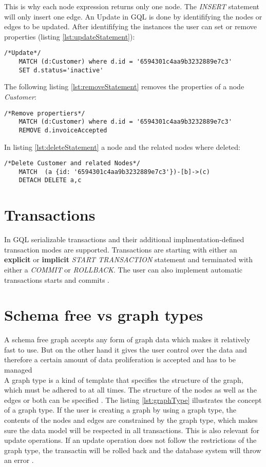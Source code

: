 This is why each node expression returns only one node. The \textit{INSERT} statement will only insert one edge.\newline
An Update in GQL is done by identififying the nodes or edges to be updated.
After identififying the instances the user can set or remove properties (listing \ref{lst:updateStatement}):
\begin{lstlisting}[caption={Update statements in GQL}, label={lst:updateStatement}] 
	/*Update*/
	MATCH (d:Customer) where d.id = '6594301c4aa9b3232889e7c3'
	SET d.status='inactive'
\end{lstlisting}
The following listing \ref{lst:removeStatement} removes the properties of a node \textit{Customer}:
\begin{lstlisting}[caption={Delete propteries in GQL}, label={lst:removeStatement}] 
	/*Remove propertiers*/
	MATCH (d:Customer) where d.id = '6594301c4aa9b3232889e7c3'
	REMOVE d.invoiceAccepted
\end{lstlisting}
In listing \ref{lst:deleteStatement} a node and the related nodes where deleted:
\begin{lstlisting}[caption={Remove nodes in GQL cascading}, label={lst:deleteStatement}] 
	/*Delete Customer and related Nodes*/
	MATCH  (a {id: '6594301c4aa9b3232889e7c3'})-[b]->(c)
	DETACH DELETE a,c
\end{lstlisting}
\section{Transactions}
\label{sec:iso:transactions}
In GQL serializable transactions and their additional implmentation-defined transaction modes 
are supported.
Transactions are starting with either an \textbf{explicit} or \textbf{implicit} \textit{START TRANSACTION}
statement and terminated with either a \textit{COMMIT} or \textit{ROLLBACK}.
The user can also  implement automatic transactions starts and commits \citep{hare_isoiec_2024}.

\section{Schema free vs graph types}
\label{sec:iso:schema_free_vs_graph_types}
A schema free graph accepts any form of graph data which makes it relatively fast to use. 
But on the other hand it gives the user control over the data 
and therefore a certain amount of data proliferation is accepted and has to be managed \\
A graph type is a kind of template that specifies the structure of the graph, which must be adhered to at all times.
The structure of the nodes as well as the edges or both can be specified \citep{10565888}.
The listing \ref{lst:graphType} illustrates the concept of a graph type.
If the user is creating a graph by using a graph type, the contents of the nodes and edges 
are constrained by the graph type, which makes sure the data model will be respected in 
all transactions. This is also relevant for update operations. If an update operation does 
not follow the restrictions of the graph type, the transactin will be rolled back and 
the database system will throw an error \citep{10565888}.

